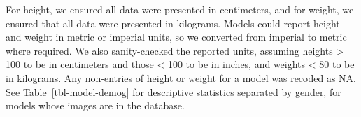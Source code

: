 \documentclass[
  letterpaper,
  DIV=11,
  numbers=noendperiod]{scrartcl}
\newlength\Oldarrayrulewidth
\newlength\Oldtabcolsep
\begin{document}
For height, we ensured all data were presented in centimeters, and for
weight, we ensured that all data were presented in kilograms. Models
could report height and weight in metric or imperial units, so we
converted from imperial to metric where required. We also sanity-checked
the reported units, assuming heights \textgreater{} 100 to be in
centimeters and those \textless{} 100 to be in inches, and weights
\textless{} 80 to be in kilograms. Any non-entries of height or weight
for a model was recoded as NA. See Table~\ref{tbl-model-demog} for
descriptive statistics separated by gender, for models whose images are
in the database.

\end{document}
